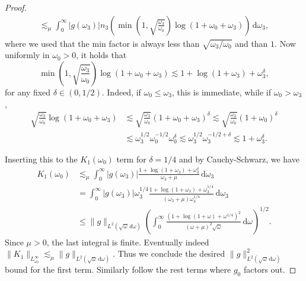 \documentclass[10pt,a4paper]{amsart}
\newcommand{\dd}{{\, \mathrm d}}
\begin{document}
\begin{proof}
\begin{align*}
\lesssim_\mu 
\int_0^\infty |g(\omega_3)|n_3 
\left(
\min\left(1,\sqrt{\frac{\omega_3}{\omega_0}}\right)
\log(1+\omega_0+\omega_3)
\right) \dd \omega_3, 
\end{align*}
where we used that the min factor is always less than $\sqrt{\omega_3/\omega_0}$ and than $1$. 
Now uniformly in $\omega_0>0$, it holds that 
$$\min\left(1,\sqrt{\frac{\omega_3}{\omega_0}}\right)
\log(1+\omega_0+\omega_3)
\lesssim
1+\log(1+\omega_3) +\omega_3^{\delta},$$ 
for any fixed $\delta \in (0,1/2)$. 
Indeed, if $\omega_0 \le \omega_3$, this is immediate, while if
$\omega_0>\omega_3$, 
\begin{align*}
\sqrt{\frac{\omega_3}{\omega_0}}
\log(1+\omega_0+\omega_3)& \lesssim \sqrt{\frac{\omega_3}{\omega_0}} (1+\omega_0+\omega_3)^{\delta}\lesssim \sqrt{\frac{\omega_3}{\omega_0}}  (1+\omega_0)^{\delta}\\
&\lesssim \omega_3^{1/2}\omega_0^{-1/2} \omega_0^{\delta} \lesssim \omega_3^{1/2} \omega_3^{-1/2+\delta} \lesssim 1+ \omega_3^\delta. 
\end{align*}

Inserting this to the $K_1(\omega_0)$ term for $\delta=1/4$ and by Cauchy-Schwarz, we have
\begin{align*}
K_1(\omega_0)
&\lesssim_\mu
\int_0^\infty
|g(\omega_3)|
\frac{1+\log(1+\omega_3)+\omega_3^{\delta}}
{\omega_3+\mu}\dd \omega_3\\
&=
\int_0^\infty
|g(\omega_3)|\omega_3^{1/4}
\frac{1+\log(1+\omega_3)+\omega_3^{1/4}}
{(\omega_3+\mu)\omega_3^{1/4}}
\dd\omega_3
\\
&\le
\|g\|_{L^2(\sqrt{\omega}\,d\omega)}
\left(
\int_0^\infty
\frac{
\left(1+\log(1+\omega)+\omega^{1/4}\right)^2
}
{(\omega+\mu)^2\sqrt{\omega}}
\dd \omega
\right)^{1/2}.
\end{align*}
Since $\mu>0$, the last integral is finite. Eventually indeed 
$
\|K_1\|_{L^\infty_{\omega_0}}
\lesssim_\mu
\|g\|_{L^2(\sqrt{\omega}\dd\omega)}.$
Thus we conclude the desired $\|g\|_{L^2(\sqrt{\omega}\dd\omega)}^2$ bound for the first term. Similarly follow the rest terms where $g_0$ factors out.  


\end{proof}
\end{document}
